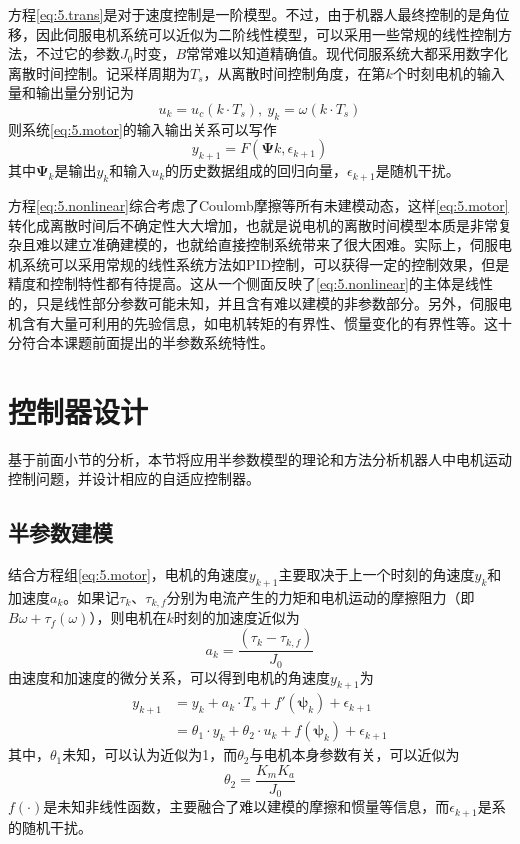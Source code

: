 方程\eqref{eq:5.trans}是对于速度控制是一阶模型。不过，由于机器人最终控制的是角位移，因此伺服电机系统可以近似为二阶线性模型，可以采用一些常规的线性控制方法，不过它的参数$J_{0}$时变，$B$常常难以知道精确值。现代伺服系统大都采用数字化离散时间控制。记采样周期为$T_{s}$，从离散时间控制角度，在第$k$个时刻电机的输入量和输出量分别记为
$$u_{k}=u_{c}(k\cdot T_{s}),\ y_{k}=\omega(k\cdot T_{s})$$
则系统\eqref{eq:5.motor}的输入输出关系可以写作
\begin{equation}\label{eq:5.nonlinear}
y_{k+1}=F(\bm{\Psi}{k},\epsilon_{k+1})
\end{equation}
其中$\bm{\Psi}_{k}$是输出$y_{k}$和输入$u_{k}$的历史数据组成的回归向量，$\epsilon_{k+1}$是随机干扰。

方程\eqref{eq:5.nonlinear}综合考虑了Coulomb摩擦等所有未建模动态，这样\eqref{eq:5.motor}转化成离散时间后不确定性大大增加，也就是说电机的离散时间模型本质是非常复杂且难以建立准确建模的，也就给直接控制系统带来了很大困难。实际上，伺服电机系统可以采用常规的线性系统方法如PID控制，可以获得一定的控制效果，但是精度和控制特性都有待提高。这从一个侧面反映了\eqref{eq:5.nonlinear}的主体是线性的，只是线性部分参数可能未知，并且含有难以建模的非参数部分。另外，伺服电机含有大量可利用的先验信息，如电机转矩的有界性、惯量变化的有界性等。这十分符合本课题前面提出的半参数系统特性。

\section{控制器设计}\label{chap:5.2}
基于前面小节的分析，本节将应用半参数模型的理论和方法分析机器人中电机运动控制问题，并设计相应的自适应控制器。
\subsection{半参数建模}\label{5.2.1}
结合方程组\eqref{eq:5.motor}，电机的角速度$y_{k+1}$主要取决于上一个时刻的角速度$y_{k}$和加速度$a_{k}$。如果记$\tau_{k}$、$\tau_{k,f}$分别为电流产生的力矩和电机运动的摩擦阻力（即$B \omega + \tau_{f}(\omega)$），则电机在$k$时刻的加速度近似为
$$a_{k}=\frac{(\tau_{k}-\tau_{k,f})}{J_{0}}$$
由速度和加速度的微分关系，可以得到电机的角速度$y_{k+1}$为
\begin{equation}\label{eq:5.yk1}
\begin{split}
y_{k+1}&=y_{k}+a_{k}\cdot T_{s}+f'(\bm{\psi}_{k})+\epsilon_{k+1}\\
&=\theta_{1}\cdot y_{k}+\theta_{2}\cdot u_{k}+f(\bm{\psi}_{k})+\epsilon_{k+1}
\end{split}
\end{equation}
其中，$\theta_{1}$未知，可以认为近似为1，而$\theta_{2}$与电机本身参数有关，可以近似为
$$\theta_{2}=\frac{K_{m}K_{a}}{J_{0}}$$
$f(\cdot)$是未知非线性函数，主要融合了难以建模的摩擦和惯量等信息，而$\epsilon_{k+1}$是系的随机干扰。

